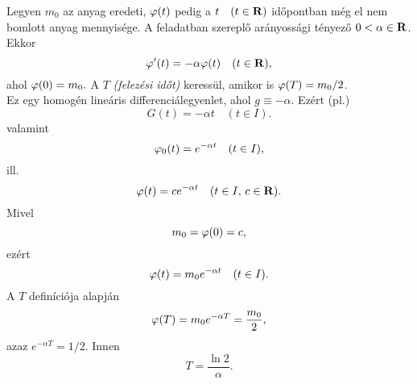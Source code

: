 Legyen $m_0$ az anyag eredeti, $\varphi(t)$ pedig a $t \quad (t \in \mathbf{R})$ időpontban még el nem bomlott anyag mennyisége. A feladatban szereplő arányossági tényező $0 < \alpha \in \mathbf{R}$. Ekkor
\[
	\varphi'(t) = -\alpha \varphi(t) \quad (t \in \mathbf{R}),
\]
ahol $\varphi(0) = m_0.$ A $T$ \textit{(felezési időt)} keressül, amikor is $\varphi(T) = m_0 / 2$.\\

Ez egy homogén lineáris differenciálegyenlet, ahol $g \equiv -\alpha$. Ezért (pl.)
\[
	G(t) = -\alpha t \quad (t \in I).
\]
valamint
\[
	\varphi_0(t) = e^{- \alpha t} \quad (t \in I),
\]
ill.
\[
	\varphi(t)  = c e ^{- \alpha t } \quad (t \in I, \, c \in \mathbf{R}).
\]
Mivel
\[
	m_0 = \varphi(0) = c,
\]
ezért
\[
	\varphi(t) = m_0 e^{- \alpha t} \quad (t \in I).
\]
A $T$ definíciója alapján
\[
	\varphi(T) = m_0 e^{- \alpha T} = \frac{m_0}{2},
\]
azaz $e^{- \alpha T} = 1 /2$. Innen
\[
	T = \frac{\ln 2}{\alpha}.
\]